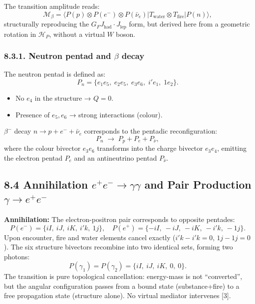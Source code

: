 \documentclass[11pt]{article}
\providecommand{\tightlist}{\setlength{\itemsep}{2pt}\setlength{\parskip}{6pt}}
\let\oldmathcal\mathcal
\renewcommand{\mathcal}[1]{\oldmathcal{#1}}
\providecommand{\tightlist}{%
  \setlength{\itemsep}{2pt}\setlength{\parskip}{6pt}
}
\begin{document}
The transition amplitude reads: \[
\mathcal{M}_{\beta} = \langle P(p) \otimes P(e^-) \otimes P(\bar{\nu}_e) | T_{\text{water}} \otimes T_{\text{fire}} | P(n) \rangle,
\] structurally reproducing the
\(G_F J_{\text{had}} \cdot J_{\text{lep}}\) form, but derived here from
a geometric rotation in \(\mathcal{H}_P\), without a virtual \(W\)
boson.

\hypertarget{neutron-pentad-and-beta-decay}{%
\subsubsection{\texorpdfstring{8.3.1. Neutron pentad and \(\beta\)
decay}{8.3.1. Neutron pentad and \textbackslash beta decay}}\label{neutron-pentad-and-beta-decay}}

The neutron pentad is defined as: \[
P_n = \{ e_1e_5,\; e_2e_5,\; e_3e_6,\; i'e_1,\; 1e_2 \}.
\]

\begin{itemize}
\tightlist
\item
  No \(e_4\) in the structure → \(Q=0\).
\item
  Presence of \(e_5,e_6\) → strong interactions (colour).
\end{itemize}

\(\beta^-\) decay \(n \to p + e^- + \bar{\nu}_e\) corresponds to the
pentadic reconfiguration: \[
P_n \;\longrightarrow\; P_p + P_e + P_{\bar{\nu}},
\] where the colour bivector \(e_3e_6\) transforms into the charge
bivector \(e_3e_4\), emitting the electron pentad \(P_e\) and an
antineutrino pentad \(P_{\bar{\nu}}\).

\hypertarget{annihilation-ee--to-gammagamma-and-pair-production-gamma-to-ee-}{%
\subsection{\texorpdfstring{8.4 Annihilation \(e^+e^- \to \gamma\gamma\)
and Pair Production
\(\gamma \to e^+e^-\)}{8.4 Annihilation e\^{}+e\^{}- \textbackslash to \textbackslash gamma\textbackslash gamma and Pair Production \textbackslash gamma \textbackslash to e\^{}+e\^{}-}}\label{annihilation-ee--to-gammagamma-and-pair-production-gamma-to-ee-}}

\textbf{Annihilation:} The electron-positron pair corresponds to
opposite pentades: \[
P(e^-) = \{iI,\ iJ,\ iK,\ i'k,\ 1j\}, \quad P(e^+) = \{-iI,\ -iJ,\ -iK,\ -i'k,\ -1j\}.
\] Upon encounter, fire and water elements cancel exactly
(\(i'k - i'k = 0\), \(1j - 1j = 0\)). The six structure bivectors
recombine into two identical sets, forming two photons: \[
P(\gamma_1) = P(\gamma_2) = \{iI,\ iJ,\ iK,\ 0,\ 0\}.
\] The transition is pure topological cancellation: energy-mass is not
``converted'', but the angular configuration passes from a bound state
(substance+fire) to a free propagation state (structure alone). No
virtual mediator intervenes {[}3{]}.
\end{document}
